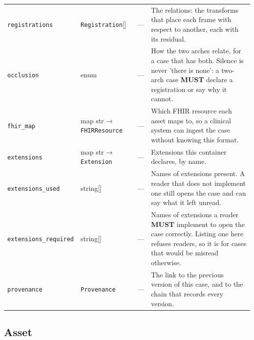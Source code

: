 \documentclass[11pt,a4paper]{article}
\newcommand{\MUST}{\textcolor{uosred}{\textbf{MUST}}}
\newcommand{\code}[1]{\texttt{\small #1}}
\begin{document}
\begin{longtable}{L{3.5cm} L{3.0cm} C{1.4cm} L{6.4cm}}
\code{registrations} & \code{Registration}[] & --- & The relations: the transforms that place each frame with respect to another, each with its residual.\\
\code{occlusion} & enum & --- & How the two arches relate, for a case that has both. Silence is never 'there is none': a two-arch case \MUST{} declare a registration or say why it cannot.\\
\code{fhir\_map} & map str$\to$\code{FHIRResource} & --- & Which FHIR resource each asset maps to, so a clinical system can ingest the case without knowing this format.\\
\code{extensions} & map str$\to$\code{Extension} & --- & Extensions this container declares, by name.\\
\code{extensions\_used} & string[] & --- & Names of extensions present. A reader that does not implement one still opens the case and can say what it left unread.\\
\code{extensions\_required} & string[] & --- & Names of extensions a reader \MUST{} implement to open the case correctly. Listing one here refuses readers, so it is for cases that would be misread otherwise.\\
\code{provenance} & \code{Provenance} & --- & The link to the previous version of this case, and to the chain that records every version.\\
\bottomrule
\end{longtable}

\subsection{Asset}
\end{document}
